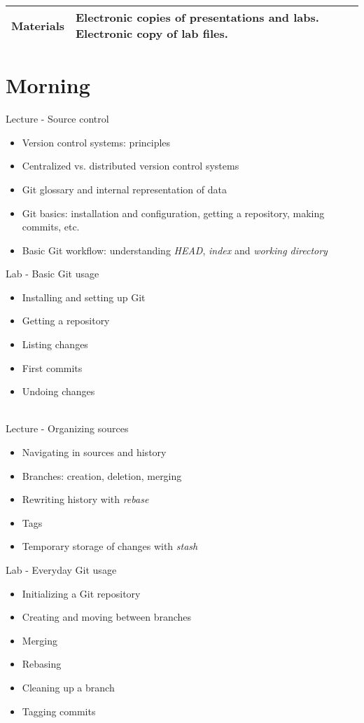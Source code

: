 \documentclass[a4paper,12pt,obeyspaces,spaces,hyphens]{article}
\begin{document}
{\begin{tabularx}{\textwidth}{|g|h|}
    {\bf Materials} & Electronic copies of presentations and
    labs.
    \newline Electronic copy of lab files.\\
    \hline

\end{tabularx}}
\normalsize

\section{Morning}

\feagendatwocolumn
{Lecture - Source control}
{
  \begin{itemize}
  \item Version control systems: principles
  \item Centralized vs. distributed version control systems
  \item Git glossary and internal representation of data
  \item Git basics: installation and configuration, getting a repository, making commits, etc.
  \item Basic Git workflow: understanding {\em HEAD}, {\em index} and {\em working directory}
  \end{itemize}
}
{Lab - Basic Git usage}
{
  \begin{itemize}
  \item Installing and setting up Git
  \item Getting a repository
  \item Listing changes
  \item First commits
  \item Undoing changes
  \end{itemize}
}
\\
\feagendatwocolumn
{Lecture - Organizing sources}
{
  \begin{itemize}
  \item Navigating in sources and history
  \item Branches: creation, deletion, merging
  \item Rewriting history with {\em rebase}
  \item Tags
  \item Temporary storage of changes with {\em stash}
  \end{itemize}
}
{Lab - Everyday Git usage}
{
  \begin{itemize}
  \item Initializing a Git repository
  \item Creating and moving between branches
  \item Merging
  \item Rebasing
  \item Cleaning up a branch
  \item Tagging commits
  \end{itemize}
}
\end{document}
